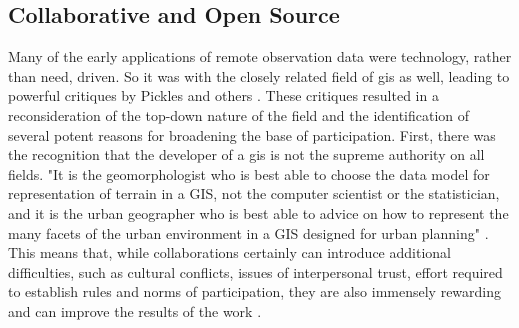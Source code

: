 \documentclass[notitlepage]{article}
\begin{document}
%

\subsection{Collaborative and Open Source} \label{sec:collaborative}

Many of the early applications of remote observation data were technology, rather than need, driven. So it was with the closely related field of \ac{gis} as well, leading to powerful critiques by Pickles and others \cite{picklesGroundTruthSocial1994}. These critiques resulted in a reconsideration of the top-down nature of the field and the identification of several potent reasons for broadening the base of participation. First, there was the recognition that the developer of a \ac{gis} is not the supreme authority on all fields. "It is the geomorphologist who is best able to choose the data model for representation of terrain in a GIS, not the computer scientist or the statistician, and it is the urban geographer who is best able to advice on how to represent the many facets of the urban environment in a GIS designed for urban planning" \cite{goodchildGeographicInformationSystems1994}. This means that, while collaborations certainly can introduce additional difficulties, such as cultural conflicts, issues of interpersonal trust, effort required to establish rules and norms of participation, they are also immensely rewarding and can improve the results of the work \cite{tullochInstitutionalGeographicInformation2007}. 
\end{document}
